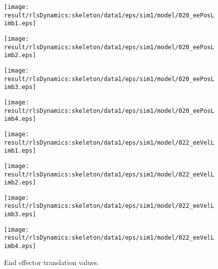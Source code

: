 \begin{figure}[h]
\centering
\begin{minipage}{0.24\linewidth}
\centering
\texttt{[image: \\result/rlsDynamics:skeleton/data1/eps/sim1/model/020\_eePosLimb1.eps]}
\par\footnotesize{}
\end{minipage}
\begin{minipage}{0.24\linewidth}
\centering
\texttt{[image: \\result/rlsDynamics:skeleton/data1/eps/sim1/model/020\_eePosLimb2.eps]}
\par\footnotesize{}
\end{minipage}
\begin{minipage}{0.24\linewidth}
\centering
\texttt{[image: \\result/rlsDynamics:skeleton/data1/eps/sim1/model/020\_eePosLimb3.eps]}
\par\footnotesize{}
\end{minipage}
\begin{minipage}{0.24\linewidth}
\centering
\texttt{[image: \\result/rlsDynamics:skeleton/data1/eps/sim1/model/020\_eePosLimb4.eps]}
\par\footnotesize{}
\end{minipage}
\begin{minipage}{0.24\linewidth}
\centering
\texttt{[image: \\result/rlsDynamics:skeleton/data1/eps/sim1/model/022\_eeVelLimb1.eps]}
\par\footnotesize{}
\end{minipage}
\begin{minipage}{0.24\linewidth}
\centering
\texttt{[image: \\result/rlsDynamics:skeleton/data1/eps/sim1/model/022\_eeVelLimb2.eps]}
\par\footnotesize{}
\end{minipage}
\begin{minipage}{0.24\linewidth}
\centering
\texttt{[image: \\result/rlsDynamics:skeleton/data1/eps/sim1/model/022\_eeVelLimb3.eps]}
\par\footnotesize{}
\end{minipage}
\begin{minipage}{0.24\linewidth}
\centering
\texttt{[image: \\result/rlsDynamics:skeleton/data1/eps/sim1/model/022\_eeVelLimb4.eps]}
\par\footnotesize{}
\end{minipage}

\caption{End effector translation values.}
\end{figure}
